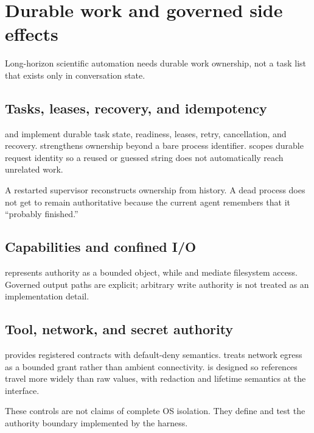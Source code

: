 \section{Durable work and governed side effects}

Long-horizon scientific automation needs durable work ownership, not a task list that exists only in conversation state.

\subsection{Tasks, leases, recovery, and idempotency}
 and  implement durable task state, readiness, leases, retry, cancellation, and recovery.  strengthens ownership beyond a bare process identifier.  scopes durable request identity so a reused or guessed string does not automatically reach unrelated work.

A restarted supervisor reconstructs ownership from history. A dead process does not get to remain authoritative because the current agent remembers that it ``probably finished.''

\subsection{Capabilities and confined I/O}
 represents authority as a bounded object, while  and  mediate filesystem access. Governed output paths are explicit; arbitrary write authority is not treated as an implementation detail.

\subsection{Tool, network, and secret authority}
 provides registered contracts with default-deny semantics.  treats network egress as a bounded grant rather than ambient connectivity.  is designed so references travel more widely than raw values, with redaction and lifetime semantics at the interface.

These controls are not claims of complete OS isolation. They define and test the authority boundary implemented by the harness.

